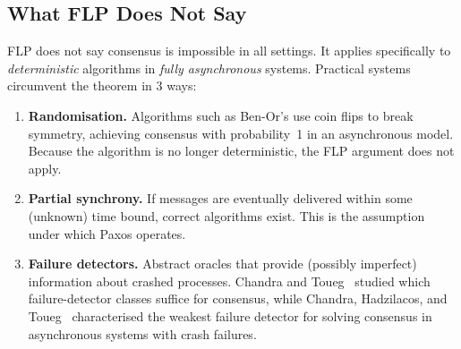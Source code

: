 \subsection{What FLP Does Not Say}

FLP does not say consensus is impossible in all settings. It applies specifically to \emph{deterministic} algorithms in \emph{fully asynchronous} systems. Practical systems circumvent the theorem in 3 ways:\\[-0.8cm]
\begin{enumerate}[label=(\roman*)]
    \item \textbf{Randomisation.} Algorithms such as Ben-Or's use coin flips to break symmetry, achieving consensus with probability~1 in an asynchronous model. Because the algorithm is no longer deterministic, the FLP argument does not apply.
    \item \textbf{Partial synchrony.} If messages are eventually delivered within some (unknown) time bound, correct algorithms exist. This is the assumption under which Paxos operates.
    \item \textbf{Failure detectors.} Abstract oracles that provide (possibly imperfect) information about crashed processes. Chandra and Toueg~\cite{chandra1996} studied which failure-detector classes suffice for consensus, while Chandra, Hadzilacos, and Toueg~\cite{cht1996} characterised the weakest failure detector for solving consensus in asynchronous systems with crash failures.
\end{enumerate}


